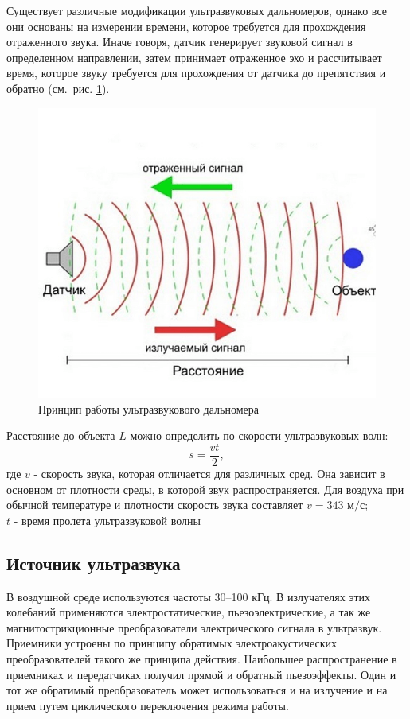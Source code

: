 \documentclass[12pt]{article}
\begin{document}
 Существует различные модификации ультразвуковых дальномеров, однако все они основаны на измерении времени, которое требуется для прохождения отраженного звука. Иначе говоря, датчик генерирует звуковой сигнал в определенном направлении, затем принимает отраженное эхо и рассчитывает время, которое звуку требуется для прохождения от датчика до препятствия и обратно (см.~рис. \ref{fig:screenshot001}).

\begin{figure}[H]
	\centering
	\includegraphics[width=0.7\linewidth]{images/screenshot001}
	\caption{Принцип работы ультразвукового дальномера}
	\label{fig:screenshot001}
\end{figure}

Расстояние до объекта \(L\) можно определить по скорости ультразвуковых волн:
\[s=\frac{vt}{2},\]
где \(v\) - скорость звука, которая отличается для различных сред. Она зависит в основном от плотности среды, в которой звук распространяется. Для воздуха при обычной температуре и плотности скорость звука составляет \(v=343 \text{ м/с}\);\\
\(t\) - время пролета ультразвуковой волны

\subsection{Источник ультразвука}
В воздушной среде используются частоты 30–100 кГц. В излучателях этих колебаний применяются электростатические, пьезоэлектрические, а так же магнитострикционные преобразователи электрического сигнала в ультразвук. Приемники устроены по принципу обратимых электроакустических преобразователей такого же принципа действия. Наибольшее распространение в приемниках и передатчиках получил прямой и обратный пьезоэффекты. Один и тот же обратимый преобразователь может использоваться и на излучение и на прием путем циклического переключения режима работы.
\end{document}

